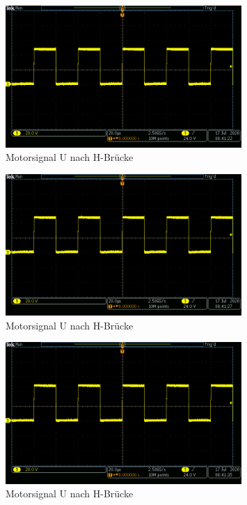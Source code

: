 \begin{appendix}
\newpage


\begin{figure}[h!]
\center
\includegraphics[width = 0.8\textwidth]{graphics/Motor_U}
\caption{Motorsignal U nach H-Brücke}
\label{fig:PWM_UX1_H}
\end{figure}

\begin{figure}[h!]
\center
\includegraphics[width = 0.8\textwidth]{graphics/Motor_V}
\caption{Motorsignal U nach H-Brücke}
\label{fig:PWM_UX1_H}
\end{figure}

\newpage


\begin{figure}[h!]
\center
\includegraphics[width = 0.8\textwidth]{graphics/Motor_W}
\caption{Motorsignal U nach H-Brücke}
\label{fig:PWM_UX1_H}
\end{figure}



\end{appendix}

